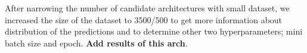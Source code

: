 \documentclass[a4paper,times,12pt]{article}
\begin{document}
After narrowing the number of candidate architectures with small dataset, we increased the size of the dataset to 3500/500 to get more information about distribution of the predictions and to determine other two hyperparameters; mini batch size and epoch. \textbf{Add results of this arch}.

\newpage
\end{document}
